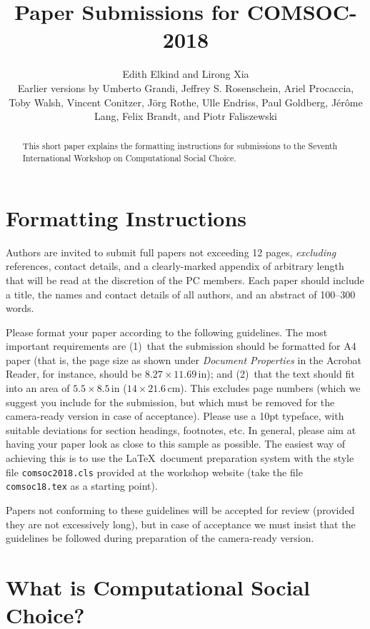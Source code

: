\documentclass{comsoc2018}
\title{Paper Submissions for COMSOC-2018}
\author{Edith Elkind and Lirong Xia\\$ $ \\
\footnotesize{Earlier versions by Umberto Grandi, Jeffrey S. Rosenschein, Ariel Procaccia, Toby Walsh, Vincent Conitzer, J\"org Rothe, Ulle Endriss, Paul Goldberg, J\'er\^ome Lang, Felix Brandt, and Piotr Faliszewski}}
\begin{document}

\begin{abstract}
  This short paper explains the formatting instructions for
  submissions to the Seventh International Workshop on Computational
  Social Choice.
\end{abstract}


\section{Formatting Instructions}

Authors are invited to submit full papers not exceeding 12 pages, 
\emph{excluding} references, contact details, and a clearly-marked appendix of arbitrary length that will be read at the discretion of the PC members. 
Each paper should include 
a title, the names and contact details of all authors, and an abstract 
of 100--300 words.


Please format your paper according to the following guidelines.
The most important requirements are (1)~that the submission should be 
formatted for A4 paper (that is, the page size as shown under 
\emph{Document Properties} in the Acrobat Reader, for instance, should 
be $8.27\times 11.69\,\mbox{in}$); and (2)~that the text should fit into 
an area of $5.5\times 8.5\,\mbox{in}$ ($14\times 21.6\,\mbox{cm}$). 
This excludes page numbers (which we suggest you include for the 
submission, but which must be removed for the camera-ready version in 
case of acceptance). Please use a 10pt typeface, with suitable deviations
for section headings, footnotes, etc. In general, please aim at having 
your paper look as close to this sample as possible. The easiest way of 
achieving this is to use the \LaTeX\ document preparation system with the 
style file \texttt{comsoc2018.cls} provided at the workshop website 
(take the file \texttt{comsoc18.tex} as a starting point).

Papers not conforming to these guidelines will be accepted for review
(provided they are not excessively long), but in case of acceptance we
must insist that the guidelines be followed during preparation of the 
camera-ready version.  


\section{What is Computational Social Choice?}
\end{document}

